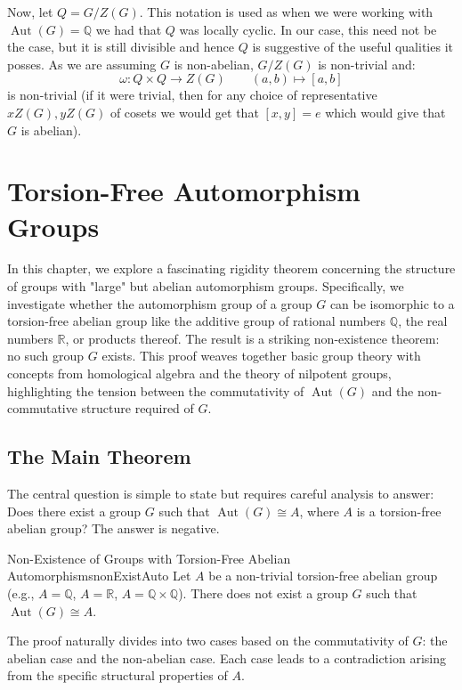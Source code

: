 \documentclass{book}
\newcommand{\Q}{{\mathbb{Q}}}
\newcommand{\R}{{\mathbb{R}}}
\newcommand{\Aut}{{\operatorname{Aut}}}
\begin{document}
Now, let $Q = G/Z(G)$. This notation is used as when we were working with $\Aut(G) = \Q$ we had that $Q$ was
locally cyclic. In our case, this need not be the case, but it is still divisible and hence $Q$ is suggestive
of the useful qualities it posses. As we are assuming $G$ is non-abelian, $G/Z(G)$ is non-trivial and:
\[
  \omega: Q\times Q \to Z(G) \qquad (a,b) \mapsto [a,b]
\]
is non-trivial (if it were trivial, then for any choice of representative $xZ(G),yZ(G)$ of cosets we would get that
$[x,y] = e$ which would give that $G$ is abelian).

\chapter{Torsion-Free Automorphism Groups}

In this chapter, we explore a fascinating rigidity theorem concerning the structure of groups with "large" but abelian automorphism groups. Specifically, we investigate whether the automorphism group of a group $G$ can be isomorphic to a torsion-free abelian group like the additive group of rational numbers $\Q$, the real numbers $\R$, or products thereof. The result is a striking non-existence theorem: no such group $G$ exists. This proof weaves together basic group theory with concepts from homological algebra and the theory of nilpotent groups, highlighting the tension between the commutativity of $\Aut(G)$ and the non-commutative structure required of $G$.

\section{The Main Theorem}

The central question is simple to state but requires careful analysis to answer: Does there exist a group $G$ such that $\Aut(G) \cong A$, where $A$ is a torsion-free abelian group? The answer is negative.

\begin{thm}{Non-Existence of Groups with Torsion-Free Abelian Automorphisms}{nonExistAuto}
    Let $A$ be a non-trivial torsion-free abelian group (e.g., $A = \Q$, $A = \R$, $A = \Q \times \Q$). There does not exist a group $G$ such that $\Aut(G) \cong A$.
\end{thm}

The proof naturally divides into two cases based on the commutativity of $G$: the abelian case and the non-abelian case. Each case leads to a contradiction arising from the specific structural properties of $A$.
\end{document}
